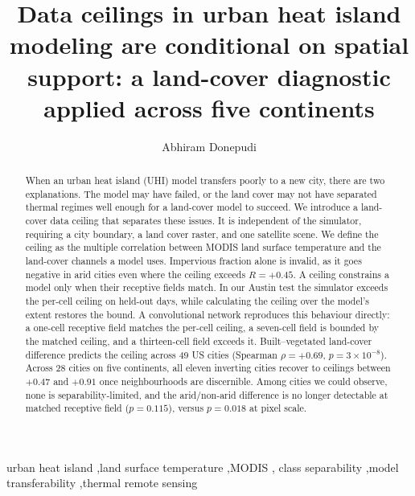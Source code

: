 \documentclass[preprint,12pt,authoryear]{elsarticle}
\begin{document}
\begin{frontmatter}

\title{Data ceilings in urban heat island modeling are conditional on
spatial support: a land-cover diagnostic applied across five continents}

\author{Abhiram Donepudi}

\begin{abstract}
When an urban heat island (UHI) model transfers poorly to a new city,
there are two explanations. The model may have failed, or the land cover
may not have separated thermal regimes well enough for a land-cover model
to succeed. We introduce a land-cover data ceiling that separates these
issues. It is independent of the simulator, requiring a city boundary, a
land cover raster, and one satellite scene. We define the ceiling as the
multiple correlation between MODIS land surface temperature and the
land-cover channels a model uses. Impervious fraction alone is invalid, as
it goes negative in arid cities even where the ceiling exceeds
$R = +0.45$. A ceiling constrains a model only when their receptive fields
match. In our Austin test the simulator exceeds the per-cell ceiling on
held-out days, while calculating the ceiling over the model's extent
restores the bound. A convolutional network reproduces this behaviour
directly: a one-cell receptive field matches the per-cell ceiling, a
seven-cell field is bounded by the matched ceiling, and a thirteen-cell
field exceeds it. Built--vegetated land-cover difference predicts the
ceiling across 49 US cities (Spearman $\rho = +0.69$,
$p = 3 \times 10^{-8}$). Across 28 cities on five continents, all eleven
inverting cities recover to ceilings between $+0.47$ and $+0.91$ once
neighbourhoods are discernible. Among cities we could observe, none is
separability-limited, and the arid/non-arid difference is no longer detectable at
matched receptive field ($p = 0.115$), versus $p = 0.018$ at pixel scale.
\end{abstract}

\begin{keyword}
urban heat island \sep land surface temperature \sep MODIS \sep
class separability \sep model transferability \sep thermal remote sensing
\end{keyword}

\end{frontmatter}
\end{document}
